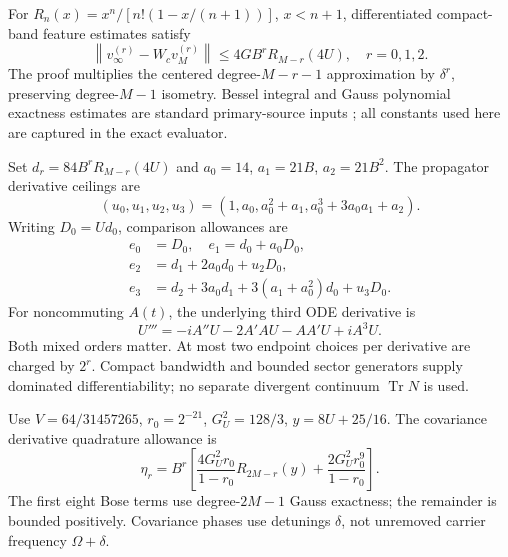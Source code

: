 \documentclass[a4paper,conference]{IEEEtran}
\newcommand{\Tr}{\operatorname{Tr}}
\newcommand{\norm}[1]{\left\|#1\right\|}
\begin{document}
For $R_n(x)=x^n/[n!(1-x/(n+1))]$, $x<n+1$, differentiated compact-band feature estimates satisfy
\begin{equation}
\norm{v_\infty^{(r)}-W_cv_M^{(r)}}\le4GB^rR_{M-r}(4U),\quad r=0,1,2.
\end{equation}
The proof multiplies the centered degree-$M-r-1$ approximation by $\delta^r$, preserving degree-$M-1$ isometry. Bessel integral and Gauss polynomial exactness estimates are standard primary-source inputs \cite{nistb,nistg}; all constants used here are captured in the exact evaluator.

Set $d_r=84B^rR_{M-r}(4U)$ and $a_0=14$, $a_1=21B$, $a_2=21B^2$. The propagator derivative ceilings are
\begin{equation}
(u_0,u_1,u_2,u_3)=(1,a_0,a_0^2+a_1,a_0^3+3a_0a_1+a_2).
\end{equation}
Writing $D_0=Ud_0$, comparison allowances are
\begin{align}
e_0&=D_0,\quad e_1=d_0+a_0D_0,\\
e_2&=d_1+2a_0d_0+u_2D_0,\\
e_3&=d_2+3a_0d_1+3(a_1+a_0^2)d_0+u_3D_0.
\end{align}
For noncommuting $A(t)$, the underlying third ODE derivative is
\begin{equation}
U'''=-iA''U-2A'AU-AA'U+iA^3U.
\end{equation}
Both mixed orders matter. At most two endpoint choices per derivative are charged by $2^r$. Compact bandwidth and bounded sector generators supply dominated differentiability; no separate divergent continuum $\Tr N$ is used.

Use $V=64/31457265$, $r_0=2^{-21}$, $G_U^2=128/3$, $y=8U+25/16$. The covariance derivative quadrature allowance is
\begin{equation}
\eta_r=B^r\left[\frac{4G_U^2r_0}{1-r_0}R_{2M-r}(y)
+\frac{2G_U^2r_0^9}{1-r_0}\right].
\end{equation}
The first eight Bose terms use degree-$2M-1$ Gauss exactness; the remainder is bounded positively. Covariance phases use detunings $\delta$, not unremoved carrier frequency $\Omega+\delta$.
\end{document}
